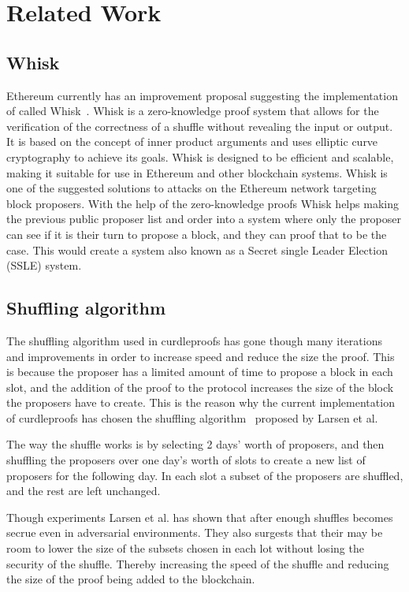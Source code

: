 \section{Related Work}\label{sec:related-work}




\subsection{Whisk}\label{sec:related-work-whisk}
Ethereum currently has an improvement proposal suggesting the implementation of called Whisk~\cite{Whisk2024}.
Whisk is a zero-knowledge proof system that allows for the verification of the correctness of a shuffle without revealing the input or output.
It is based on the concept of inner product arguments and uses elliptic curve cryptography to achieve its goals.
Whisk is designed to be efficient and scalable, making it suitable for use in Ethereum and other blockchain systems.
Whisk is one of the suggested solutions to attacks on the Ethereum network targeting block proposers.
With the help of the zero-knowledge proofs Whisk helps making the previous public proposer list and order into a system where only the proposer can see if it is their turn to propose a block, and they can proof that to be the case.
This would create a system also known as a Secret single Leader Election (SSLE) system.


\subsection{Shuffling algorithm}\label{sec:related-work-Shuffling-algorithm}
The shuffling algorithm used in curdleproofs has gone though many iterations and improvements in order to increase speed and reduce the size the proof.
This is because the proposer has a limited amount of time to propose a block in each slot, and the addition of the proof to the protocol increases the size of the block the proposers have to create.
This is the reason why the current implementation of curdleproofs has chosen the shuffling algorithm~\cite{cryptoeprint:2022/560} proposed by Larsen et al.

The way the shuffle works is by selecting 2 days' worth of proposers, and then shuffling the proposers over one day's worth of slots to create a new list of proposers for the following day.
In each slot a subset of the proposers are shuffled, and the rest are left unchanged.

Though experiments Larsen et al. has shown that after enough shuffles becomes secrue even in adversarial environments.
They also surgests that their may be room to lower the size of the subsets chosen in each lot without losing the security of the shuffle.
Thereby increasing the speed of the shuffle and reducing the size of the proof being added to the blockchain.

